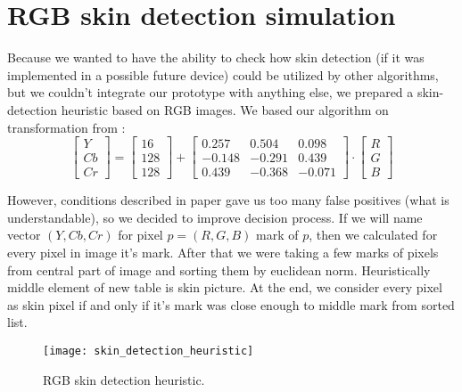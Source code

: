     \section{RGB skin detection simulation}
        Because we wanted to have the ability to check how skin detection
        (if it was implemented in a possible future device) could be utilized
        by other algorithms, but we couldn't integrate our prototype with
        anything else, we prepared a skin-detection heuristic based on RGB images.
        We based our algorithm on transformation from
        :
        \[
            \begin{bmatrix}
                Y \\
                Cb \\
                Cr
            \end{bmatrix}
            =
            \begin{bmatrix}
                16\\
                128\\
                128
            \end{bmatrix}
            +
             \begin{bmatrix}
                 0.257  &  0.504        &  0.098 \\
                -0.148  & -0.291        &  0.439 \\
                 0.439  & -0.368        & -0.071
            \end{bmatrix}
            \cdot
             \begin{bmatrix}
                R\\
                G\\
                B
            \end{bmatrix}
        \]

        However, conditions described in paper gave us too many false positives (what is understandable),
        so we decided to improve decision process. If we will name vector $(Y, Cb, Cr)$ for pixel $p = (R, G, B)$
        mark of $p$, then we calculated for every pixel in image it's mark.
        After that we were taking a few marks of pixels from central part of image and
        sorting them by euclidean norm.
        Heuristically middle element of new table is skin picture.
        At the end, we consider every pixel as skin pixel if and only if
        it's mark was close enough to middle mark from sorted list.

        \begin{figure}[H]
            \caption{RGB skin detection heuristic.}
            \centering
            \texttt{[image: skin\_detection\_heuristic]}
            \label{fig:skin_detection_heuristic}
        \end{figure}
